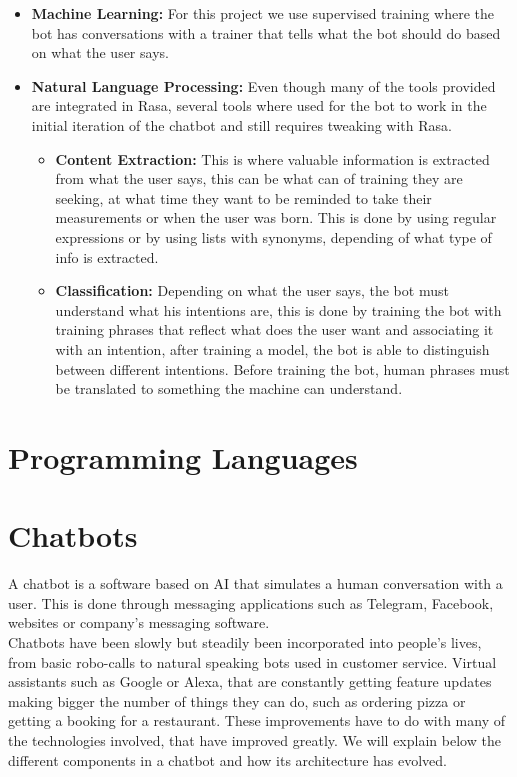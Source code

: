 \begin{itemize}
	\item {\textbf{Machine Learning:} For this project we use supervised training where the bot has conversations with a trainer that tells what the bot should do based on what the user says.}
	\item {\textbf{Natural Language Processing:} Even though many of the tools provided are integrated in Rasa, several tools where used for the bot to work in the initial iteration of the chatbot and still requires tweaking with Rasa.\\
		
		\begin{itemize}
			\item {\textbf{Content Extraction:} This is where valuable information is extracted from what the user says, this can be what can of training they are seeking, at what time they want to be reminded to take their measurements or when the user was born. This is done by using regular expressions or by using lists with synonyms, depending of what type of info is extracted.}
			\item {\textbf{Classification:} Depending on what the user says, the bot must understand what his intentions are, this is done by training the bot with training phrases that reflect what does the user want and associating it with an intention, after training a model, the bot is able to distinguish between different intentions. Before training the bot, human phrases must be translated to something the machine can understand.}
		\end{itemize}
			}
\end{itemize}

\section{Programming Languages}\label{sec:chap3_prog_lang}

\section{Chatbots}\label{sec:chap3_ai}
A chatbot is a software based on AI that simulates a human conversation with a user. This is done through messaging applications such as Telegram, Facebook, websites or company’s messaging software.\\

Chatbots have been slowly but steadily been incorporated into people’s lives, from basic robo-calls to natural speaking bots used in customer service. Virtual assistants such as Google or Alexa, that are constantly getting feature updates making bigger the number of things they can do, such as ordering pizza or getting a booking for a restaurant. These improvements have to do with many of the technologies involved, that have improved greatly. We will explain below the different components in a chatbot and how its architecture has evolved.\\

